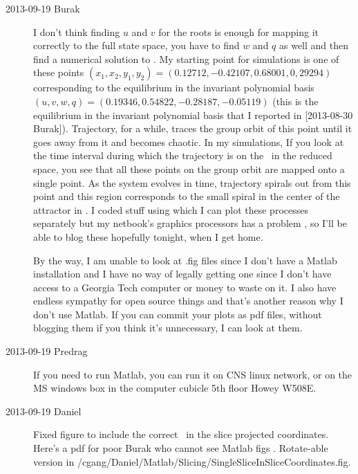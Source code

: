 \begin{description}
\item[2013-09-19 Burak] I don't think finding $u$ and $v$ for the roots is enough for mapping it
correctly to the full state space, you have to find $w$ and $q$ as well and then find a
numerical solution to . My starting point for simulations is one of these
points $(x_1, x_2, y_1, y_2) =  (0.12712, -0.42107, 0.68001, 0,29294)$ corresponding to the equilibrium
in the invariant polynomial basis $(u,v,w,q) = (0.19346, 0.54822, −0.28187, −0.05119)$ (this is the
equilibrium in the invariant polynomial basis that I reported in [2013-08-30 Burak]). Trajectory, for a
while, traces the group orbit of this point until it goes away from it and becomes chaotic.
In my simulations, If you look at the time interval during which the trajectory is on the \reqv\, in the
reduced space, you see that all these points on the group orbit are mapped onto a single point.
As the system evolves in time, trajectory spirals out from this point and this region corresponds to the
small spiral in the center of the attractor in . I coded stuff
using which I can plot these processes separately but my netbook's graphics processors has a problem , so
 I'll be able to blog these hopefully tonight, when I get home.

By the way, I am unable to look at .fig files since I don't have a Matlab installation and I have no way
 of legally getting one since I don't have access to a Georgia Tech computer or money to waste on it. I
 also have endless sympathy for open source things and that's another reason why I don't use Matlab.
 If you can commit your plots as pdf files, without blogging them if you think it's unnecessary, I can
 look at them.

\item[2013-09-19 Predrag] If you need to run Matlab, you can run it on CNS linux network,
or on the MS windows box in the computer cubicle 5th floor Howey W508E.

\item[2013-09-19 Daniel] Fixed figure to include the correct \reqv\,
in the slice projected coordinates. Here's a pdf for poor Burak who
cannot see Matlab figs .
Rotate-able version in /cgang/Daniel/Matlab/Slicing/SingleSliceInSliceCoordinates.fig.


\end{description}
